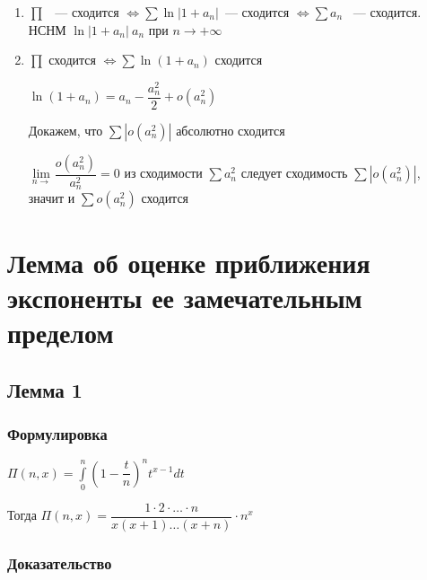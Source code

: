 \documentclass{article}
\begin{document}
            \begin{enumerate}
            
                \item $\prod$ ~--- сходится $\Leftrightarrow \sum \ln |1 + a_n| $~--- сходится $\Leftrightarrow \sum a_n$ ~--- сходится. НСНМ $\ln |1 + a_n| ~ a_n$ при $n \rightarrow +\infty$
                
                \item $\prod$ сходится $\Leftrightarrow \sum \ln (1 + a_n)$ сходится
                
                    $\ln(1 + a_n) = a_n - \dfrac{a^2_n}{2} + o(a^2_n)$
                    
                    Докажем, что $\sum |o(a^2_n)|$ абсолютно сходится
                    
                    $\lim\limits_{n \rightarrow} \dfrac{o(a^2_n)}{a^2_n} = 0$ из сходимости $\sum a^2_n$ следует сходимость $\sum |o(a^2_n)|$, значит и $\sum o(a^2_n)$ сходится
                
            \end{enumerate}
            
    \newpage
    
    \section{Лемма об оценке приближения экспоненты ее замечательным пределом}
    
        \subsection{Лемма 1}
        
            \subsubsection{Формулировка}
            
                $\Pi(n, x) = \int\limits^n_0 \left(1 - \dfrac{t}{n} \right)^n t^{x - 1} dt$
                
                Тогда $\Pi(n, x) = \dfrac{1 \cdot 2 \cdot \ldots \cdot n}{x(x + 1)\ldots(x+n)} \cdot n^x$
                
            \subsubsection{Доказательство}
            
\end{document}
